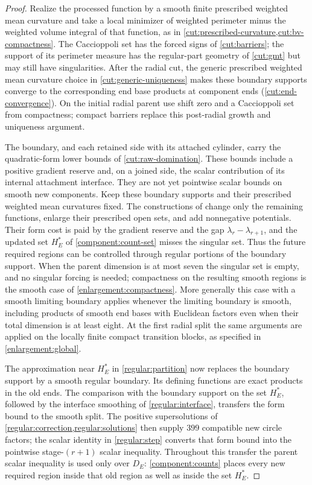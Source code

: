 \begin{proof}
Realize the processed function by a smooth finite prescribed weighted mean curvature and take a
local minimizer of weighted perimeter minus the weighted volume
integral of that function, as in \cref{cut:prescribed-curvature,cut:bv-compactness}. The Caccioppoli set has the
forced signs of \cref{cut:barriers}; the support of its perimeter measure
has the regular-part geometry of \cref{cut:gmt} but may still have
singularities. After the
radial cut, the generic prescribed weighted mean curvature choice in
\cref{cut:generic-uniqueness} makes these boundary supports converge to the
corresponding end base products at component ends
(\cref{cut:end-convergence}). On the initial radial parent use shift
zero and a Caccioppoli set from compactness; compact barriers replace this
post-radial growth and uniqueness argument.

The boundary, and each retained side with its attached cylinder,
carry the quadratic-form lower bounds of \cref{cut:raw-domination}.
These bounds include a positive gradient reserve and, on a joined
side, the scalar contribution of its internal attachment interface.
They are not yet pointwise scalar bounds on smooth new components.
Keep these boundary supports and their prescribed weighted mean curvatures fixed. The constructions of
 change only the remaining
functions, enlarge their prescribed open sets, and add nonnegative potentials. Their
form cost is paid by the gradient reserve and the gap
$\lambda_r-\lambda_{r+1}$, and the updated set $H_E^*$ of
\eqref{component:count-set} misses the singular set. Thus the future required
regions can be controlled through regular portions of the boundary support.
When the parent dimension is at most seven the
singular set is empty, and no singular forcing is needed; compactness on
the resulting smooth regions is the smooth case of
\cref{enlargement:compactness}. More generally this case with a smooth limiting boundary applies
whenever the limiting boundary is smooth, including products of smooth end bases
with Euclidean factors even when their total dimension is at least eight.
At the first radial split the same arguments
are applied on the locally finite compact transition blocks, as specified
in \cref{enlargement:global}.

The approximation near $H_E^*$ in \cref{regular:partition} now replaces
the boundary support by a smooth regular boundary. Its defining functions are
exact products in the old ends. The comparison with the boundary support on
the set $H_E^*$, followed by the interface smoothing of \cref{regular:interface},
transfers the form bound to the smooth split. The positive
supersolutions of \cref{regular:correction,regular:solutions}
then supply $399$ compatible new circle factors; the scalar identity
in \cref{regular:step} converts that form bound into the pointwise
stage-$(r+1)$ scalar inequality. Throughout this transfer the parent
scalar inequality is used only over $D_E$: \cref{component:counts}
places every new required region inside that old region as well as
inside the set $H_E^*$.


\end{proof}
